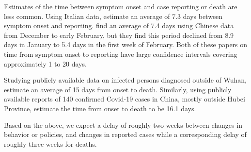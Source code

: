 \documentclass[11pt,reqno,letter]{amsart}
\theoremstyle{definition}
\def\ycolor{\color{red}}
\begin{document}
Estimates of the time between symptom onset and case reporting or death
are less common. Using Italian data, \cite{cereda2020} estimate an
average of 7.3 days between symptom onset and
reporting. \cite{zhang2020} find an average of 7.4 days using Chinese data
from December to early February, but they find this period declined
from 8.9 days in January to 5.4 days in the first week of
February. Both of these papers on time from symptom onset to reporting
have large confidence intervals covering approximately 1 to 20 days.

Studying publicly available data on infected persons diagnosed outside of Wuhan,
\cite{linton2020}  estimate an average of 15 days  from  onset to death. Similarly, using publicly available reports of 140 confirmed Covid-19 cases in China, mostly outside Hubei Province, \cite{sanche2020} estimate the time from onset to death to be  16.1 days.

Based on the above, we expect a delay of roughly two weeks between
changes in behavior or policies, and changes in reported
cases while a corresponding delay of roughly three weeks for deaths.

\end{document}
